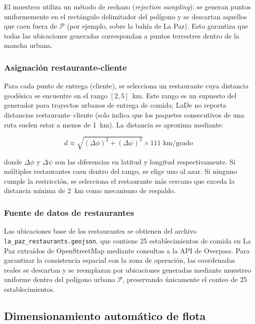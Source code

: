 \documentclass[12pt,letterpaper,oneside]{book}
\begin{document}
	El muestreo utiliza un método de rechazo (\textit{rejection sampling}): se generan
	puntos uniformemente en el rectángulo delimitador del polígono y se descartan aquellos que 
	caen fuera de $\mathcal{P}$ (por ejemplo, sobre la bahía de La Paz). Esto garantiza que 
	todas las ubicaciones generadas correspondan a puntos terrestres dentro de la mancha urbana.

	\subsubsection{Asignación restaurante-cliente}

	Para cada punto de entrega (cliente), se selecciona un restaurante cuya distancia geodésica 
	se encuentre en el rango $[2, 5]$~km. Este rango es un supuesto del generador para trayectos
	urbanos de entrega de comida; LaDe \citep{Wu2023LaDe} no reporta distancias restaurante--cliente
	(solo indica que los paquetes consecutivos de una ruta suelen estar a menos de 1~km). La distancia
	se aproxima mediante:

	\begin{equation}
		d \approx \sqrt{(\Delta\phi)^2 + (\Delta\psi)^2} \times 111 \text{ km/grado}
	\end{equation}

	\noindent donde $\Delta\phi$ y $\Delta\psi$ son las diferencias en latitud y longitud 
	respectivamente. Si múltiples restaurantes caen dentro del rango, se elige uno al azar. 
	Si ninguno cumple la restricción, se selecciona el restaurante más cercano que exceda 
	la distancia mínima de 2~km como mecanismo de respaldo.

	\subsubsection{Fuente de datos de restaurantes}

	Las ubicaciones base de los restaurantes se obtienen del archivo 
	\texttt{la\_paz\_restaurants.geojson}, que contiene 25 establecimientos de comida en La Paz 
	extraídos de OpenStreetMap \citep{Haklay2010} mediante consultas a la API de Overpass. 
	Para garantizar la consistencia espacial con la zona de operación, las coordenadas 
	reales se descartan y se reemplazan por ubicaciones generadas mediante muestreo 
	uniforme dentro del polígono urbano $\mathcal{P}$, preservando únicamente el conteo 
	de 25 establecimientos.

	\subsection{Dimensionamiento automático de flota}
\end{document}
